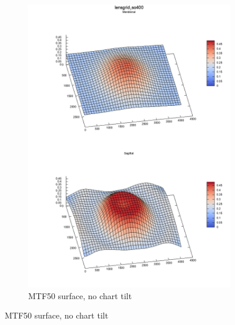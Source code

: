 \documentclass[a4paper]{article}
\begin{document}
\begin{figure}[!ht]
\begin{subfigure}[b]{0.25\textwidth}
    \includegraphics[width=\textwidth]{figures/lg_exmple_flat_surface.png}
    \caption{MTF50 surface, no chart tilt}
\end{subfigure}


\end{figure}
\end{document}
